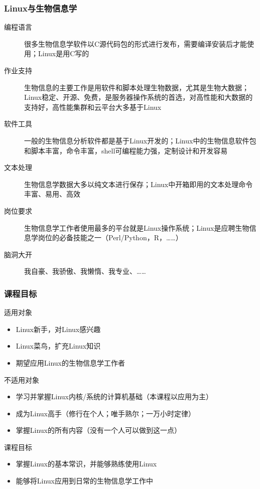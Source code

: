 \begin{frame}
\end{frame}

\begin{frame}
  \frametitle{Linux与生物信息学}
  \begin{description}
    \item[编程语言] 很多生物信息学软件以C源代码包的形式进行发布，需要编译安装后才能使用；Linux是用C写的
    \item[作业支持] 生物信息的主要工作是用软件和脚本处理生物数据，尤其是生物大数据；Linux稳定、开源、免费，是服务器操作系统的首选，对高性能和大数据的支持好，高性能集群和云平台大多基于Linux
    \item[软件工具] 一般的生物信息分析软件都是基于Linux开发的；Linux中的生物信息软件包和脚本丰富，命令丰富，shell可编程能力强，定制设计和开发容易
    \item[文本处理] 生物信息学数据大多以纯文本进行保存；Linux中开箱即用的文本处理命令丰富、易用、高效
    \item[岗位要求] 生物信息学工作者使用最多的平台就是Linux操作系统；Linux是应聘生物信息学岗位的必备技能之一（Perl/Python，R，……）
    \item[脑洞大开] 我自豪、我骄傲、我懒惰、我专业、……
  \end{description}
\end{frame}

\begin{frame}
  \frametitle{课程目标}
  \begin{block}{适用对象}
    \begin{itemize}
      \item Linux新手，对Linux感兴趣
      \item Linux菜鸟，扩充Linux知识
      \item 期望应用Linux的生物信息学工作者
    \end{itemize}
  \end{block}
  \pause
  \begin{block}{不适用对象}
    \begin{itemize}
      \item 学习并掌握Linux内核/系统的计算机基础（本课程以应用为主）
      \item 成为Linux高手（修行在个人；唯手熟尔；一万小时定律）
      \item 掌握Linux的所有内容（没有一个人可以做到这一点）
    \end{itemize}
  \end{block}
  \pause
  \begin{block}{课程目标}
    \begin{itemize}
      \item 掌握Linux的基本常识，并能够熟练使用Linux
      \item 能够将Linux应用到日常的生物信息学工作中
    \end{itemize}
  \end{block}
\end{frame}


